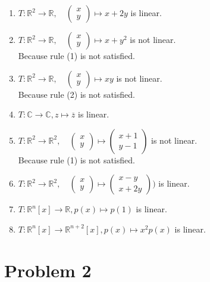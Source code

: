 \documentclass{article}
\begin{document}
\begin{enumerate}
    \item \( T: \mathbb{R}^2 \to \mathbb{R}, \quad \begin{pmatrix} x \\ y \end{pmatrix} \mapsto x + 2y \) is linear.
    \item \( T: \mathbb{R}^2 \to \mathbb{R}, \quad \begin{pmatrix} x \\ y \end{pmatrix} \mapsto x + y^2 \) is not linear. \\
    Because rule (1) is not satisfied.
    \item \( T: \mathbb{R}^2 \to \mathbb{R}, \quad \begin{pmatrix} x \\ y \end{pmatrix} \mapsto xy \) is not linear. \\
    Because rule (2) is not satisfied.
    \item \( T: \mathbb{C} \to \mathbb{C}, z \mapsto \overline{z} \) is linear.
    \item \( T: \mathbb{R}^2 \to \mathbb{R}^2, \quad \begin{pmatrix} x \\ y \end{pmatrix} \mapsto \begin{pmatrix} x + 1 \\ y - 1 \end{pmatrix} \) is not linear. \\
      Because rule (1) is not satisfied.
    \item \( T: \mathbb{R}^2 \to \mathbb{R}^2, \quad \begin{pmatrix} x \\ y \end{pmatrix} \mapsto \begin{pmatrix} x - y \\ x + 2y\end{pmatrix}  )\) is linear.
    \item \( T: \mathbb{R}^n[x] \to \mathbb{R}, p(x) \mapsto p(1) \) is linear.
    \item \( T: \mathbb{R}^n[x] \to \mathbb{R}^{n+2}[x], p(x) \mapsto x^2p(x) \) is linear.
\end{enumerate}

\section*{Problem 2}
\end{document}
